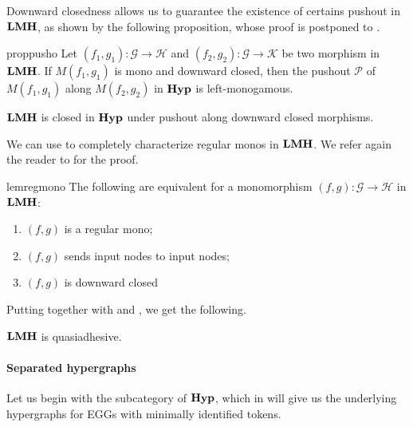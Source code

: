 \documentclass[3p]{elsarticle}
\newcommand{\catname}[1]{\textbf{\textup{#1}}}
\newcommand{\lmo}{\catname{LMH}}
\newcommand{\hyp}{\catname{Hyp}}
\theoremstyle{remark}
\theoremstyle{definition}
\begin{document}
Downward closedness allows us to guarantee the existence of certains pushout in $\lmo$, as shown by the following proposition, whose proof is postponed to . 
\begin{restatable}{prop}{pusho}\label{prop:pusho}
Let $(f_1,g_1)\colon \mathcal{G}\to \mathcal{H}$ and $(f_2, g_2)\colon \mathcal{G}\to \mathcal{K}$ be two morphism in $\lmo$. If $M(f_1,g_1)$ is mono and downward closed, then the pushout $\mathcal{P}$ of $M(f_1,g_1)$ along $M(f_2, g_2)$ in $\hyp$ is left-monogamous.
\end{restatable}

\begin{cor}\label{cor:pusho}
	$\lmo$ is closed in $\hyp$ under pushout along downward closed morphisms.
\end{cor}

We can use  to completely characterize regular monos in $\lmo$. We refer again the reader to  for the proof.

\begin{restatable}{lem}{regmono}\label{lem:regmon}
	The following are equivalent for a monomorphism $(f,g)\colon \mathcal{G}\to \mathcal{H}$ in $\lmo$:
	\begin{enumerate}
		\item $(f,g)$ is a regular mono;
		\item $(f,g)$ sends input nodes to input nodes;
		\item $(f,g)$ is downward closed
	\end{enumerate}
\end{restatable}

Putting together  with   and , we get the following.

\begin{cor}$\lmo$ is quasiadhesive.
\end{cor}


\paragraph{Separated hypergraphs}

Let us begin with the subcategory of $\hyp$, which in  will give us the underlying hypergraphs for EGGs with minimally identified tokens.
\end{document}
